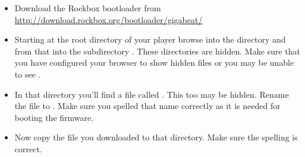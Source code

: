 
\begin{itemize}
\item Download the Rockbox bootloader from
  \url{http://download.rockbox.org/bootloader/gigabeat/}
\item Starting at the root directory of your player browse into the directory
   and from that into the subdirectory .
  These directories are hidden. Make sure that you have configured your browser
  to show hidden files or you may be unable to see .
\item In that directory you'll find a file called . This too
  may be hidden. Rename the file to . Make sure you
  spelled that name  correctly as it is needed for booting the \archosplayerman{} firmware.
\item Now copy the file  you downloaded to that directory.
  Make sure the spelling is correct.
\end{itemize}